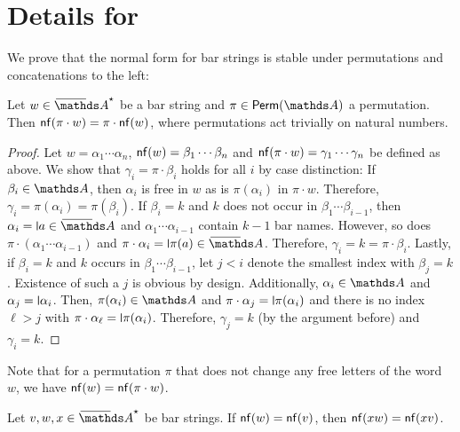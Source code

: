 \documentclass[a4paper,UKenglish,cleveref,autoref,thm-restate,numberwithinsect,final]{lipics-v2021}
\begin{document}
 \section{Details for }
We prove that the normal form for bar strings 
    is stable under permutations and concatenations to the left:
    \begin{lemma}\label{lem:nfstbPP}
        Let $w \in \barAs$ be a bar string and $\pi \in \Perm(\names)$ a permutation. Then
        $\mathsf{nf}(\pi \cdot w) = \pi \cdot \mathsf{nf}(w)$, where permutations act trivially on natural numbers.
    \end{lemma}
    \begin{proof}
        Let $w = \alpha_1 \cdots \alpha_n$, $\mathsf{nf}(w) = \beta_1 \cdots \beta_n$ and $\mathsf{nf}(\pi \cdot w) = \gamma_1 \cdots
        \gamma_n$ be defined as above. We show that $\gamma_i = \pi \cdot \beta_i$ holds for all $i$ by case
        distinction: If $\beta_i \in \names$, then $\alpha_i$ is free in $w$ as is $\pi(\alpha_i)$ in $\pi \cdot w$.
        Therefore, $\gamma_i = \pi(\alpha_i) = \pi(\beta_i)$.
        If $\beta_i = k$ and $k$ does not occur in $\beta_1 \cdots \beta_{i - 1}$, then $\alpha_i = \newletter{a} \in
        \barNames$ and $\alpha_1 \cdots \alpha_{i - 1}$ contain $k - 1$ bar names. However, so does
        $\pi \cdot (\alpha_1 \cdots \alpha_{i - 1})$ and $\pi\cdot \alpha_i = \newletter{\pi(a)} \in \barNames$.
        Therefore, $\gamma_i = k = \pi \cdot \beta_i$.
        Lastly, if $\beta_i = k$ and $k$ occurs in $\beta_1 \cdots \beta_{i - 1}$, let $j < i$ denote the smallest index
        with $\beta_j = k$. Existence of such a $j$ is obvious by design. Additionally, $\alpha_i \in \names$ and
        $\alpha_j = \newletter{\alpha_i}$.
        Then, $\pi(\alpha_i) \in \names$ and $\pi \cdot \alpha_j = \newletter{\pi(\alpha_i)}$ and there is no
        index $\ell > j$ with $\pi \cdot \alpha_\ell = \newletter{\pi(\alpha_i)}$. Therefore, $\gamma_j = k$
        (by the argument before) and $\gamma_i = k$. 
      \end{proof}
      \begin{rem}\label{R:pi.w}
        Note that for a permutation $\pi$ that does not change any free letters of the word $w$,
        we have $\mathsf{nf}(w) = \mathsf{nf}(\pi\cdot w)$.
      \end{rem}
      \begin{lemma}\label{lem:nfstbCC}
        Let $v, w, x \in \barAs$ be bar strings. If $\mathsf{nf}(w) = \mathsf{nf}(v)$, then $\mathsf{nf}(xw) = \mathsf{nf}(xv)$.
    \end{lemma}
\end{document}
